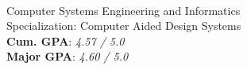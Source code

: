 \documentclass[]{deedy-resume}
\begin{document}
\begin{minipage}[t]{0.25\textwidth}
 \\
Computer Systems Engineering and Informatics \\
Specialization: Computer Aided Design Systems \\
\textbf{Cum. GPA}: \textit{4.57 / 5.0} \\
\textbf{Major GPA}: \textit{4.60 / 5.0}

\sectionspace


\end{minipage}
\hfill
\columnspace
%
%
\end{document}

